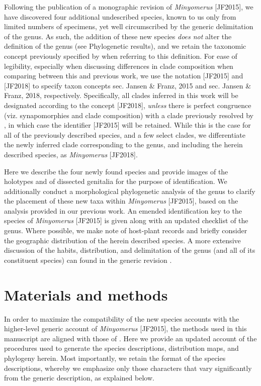\documentclass[fleqn,10pt,lineno]{wlpeerj} %
\begin{document}
	Following the publication of a monographic revision of \textit{Minyomerus} [JF2015], we have discovered four additional undescribed species, known to us only from limited numbers of specimens, yet well circumscribed by the generic delimitation of the genus.
	As such, the addition of these new species \emph{does not} alter the definition of the genus (see Phylogenetic results), and we retain the taxonomic concept previously specified by \citet{jansen2015} when referring to this definition.
	For ease of legibility, especially when discussing differences in clade composition when comparing between this and previous work, we use the notation [JF2015] and [JF2018] to specify taxon concepts sec. Jansen \& Franz, 2015 and sec. Jansen \& Franz, 2018, respectively.
	Specifically, all clades inferred in this work will be designated according to the concept [JF2018], \emph{unless} there is perfect congruence (viz. synapomorphies and clade composition) with a clade previously resolved by \citet{jansen2015}, in which case the identifier [JF2015] will be retained.
	While this is the case for all of the previously described species, and a few select clades, we differentiate the newly inferred clade corresponding to the genus, and including the herein described species, as \textit{Minyomerus} [JF2018].
	
	Here we describe the four newly found species and provide images of the holotypes and of dissected genitalia for the purpose of identification.
	We additionally conduct a morphological phylogenetic analysis of the genus to clarify the placement of these new taxa within \textit{Minyomerus} [JF2015], based on the analysis provided in our previous work.
	An emended identification key to the species of \textit{Minyomerus} [JF2015] is given along with an updated checklist of the genus.
	Where possible, we make note of host-plant records and briefly consider the geographic distribution of the herein described species.
	A more extensive discussion of the habits, distribution, and delimitation of the genus (and all of its constituent species) can found in the generic revision \citep{jansen2015}.
	
\section*{Materials and methods}
	In order to maximize the compatibility of the new species accounts with the higher-level generic account of \textit{Minyomerus} [JF2015], the methods used in this manuscript are aligned with those of \citet{jansen2015}.
	Here we provide an updated account of the procedures used to generate the species descriptions, distribution maps, and phylogeny herein.
	Most importantly, we retain the format of the species descriptions, whereby we emphasize only those characters that vary significantly from the generic description, as explained below.
\end{document}

